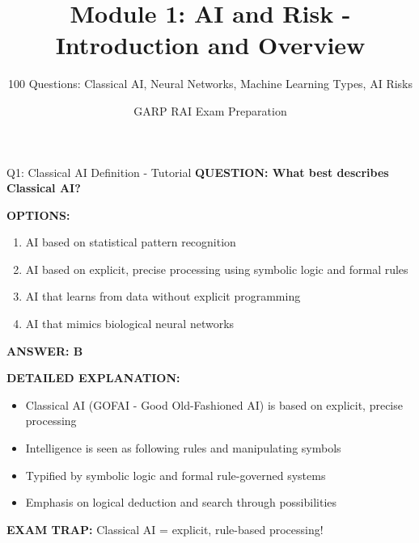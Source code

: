 \documentclass[8pt]{beamer}
\title{Module 1: AI and Risk - Introduction and Overview}
\subtitle{100 Questions: Classical AI, Neural Networks, Machine Learning Types, AI Risks}
\author{GARP RAI Exam Preparation}
\date{}
\begin{document}
	
	\begin{frame}
		\titlepage
	\end{frame}
	
	
	\begin{frame}{Q1: Classical AI Definition - Tutorial}
		\fontsize{6.5}{7.5}\selectfont
		\textbf{QUESTION: What best describes Classical AI?}
		
		\vspace{0.1cm}
		\textbf{OPTIONS:}
		\begin{enumerate}
			\item AI based on statistical pattern recognition
			\item AI based on explicit, precise processing using symbolic logic and formal rules
			\item AI that learns from data without explicit programming
			\item AI that mimics biological neural networks
		\end{enumerate}
		
		\vspace{0.1cm}
		\textcolor{myblue}{\textbf{ANSWER: B}}
		
		\vspace{0.1cm}
		\textbf{DETAILED EXPLANATION:}
		\begin{itemize}
			\item Classical AI (GOFAI - Good Old-Fashioned AI) is based on explicit, precise processing
			\item Intelligence is seen as following rules and manipulating symbols
			\item Typified by symbolic logic and formal rule-governed systems
			\item Emphasis on logical deduction and search through possibilities
		\end{itemize}
		
		\vspace{0.1cm}
		\textcolor{myred}{\textbf{EXAM TRAP:}} Classical AI = \textcolor{myblue}{explicit, rule-based processing}!
	\end{frame}
	
\end{document}
